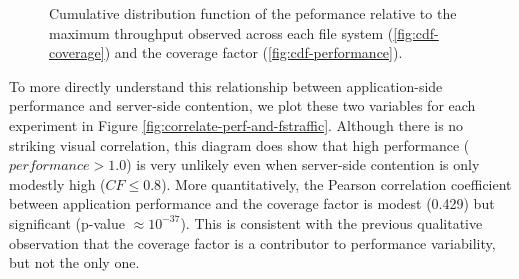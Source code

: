 \documentclass[conference,10pt,compsocconf]{IEEEtran}
\begin{document}
\begin{figure}[h]
\centering
\caption{Cumulative distribution function of the peformance relative to the
maximum throughput observed across each file system (\ref{fig:cdf-coverage}) and the coverage
factor (\ref{fig:cdf-performance}).}
\label{fig:cumulative-distribution-functions}
\end{figure}

To more directly understand this relationship between application-side
performance and server-side contention, we plot these two variables for each
experiment in Figure \ref{fig:correlate-perf-and-fstraffic}.  Although there is
no striking visual correlation, this diagram does show that high performance
($performance > 1.0$) is very unlikely even when server-side contention is only
modestly high ($CF \leq 0.8$).  More quantitatively, the Pearson correlation
coefficient between application performance and the coverage factor is modest
(0.429) but significant (p-value $\approx 10^{-37}$).  This is consistent with
the previous qualitative observation that the coverage factor is a contributor
to performance variability, but not the only one.
\end{document}
